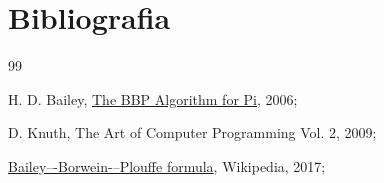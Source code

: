 \newpage
\section{Bibliografia}

\begingroup
\renewcommand{\section}[2]{}
\begin{thebibliography} {99}

    H. D. Bailey,
    \href{http://www.davidhbailey.com/dhbpapers/bbp-alg.pdf}{The BBP Algorithm for Pi},
    2006;
    
    D. Knuth,
    The Art of Computer Programming Vol. 2,
    2009;
  
    \href{https://en.wikipedia.org/wiki/Bailey%E2%80%93Borwein%E2%80%93Plouffe_formula}{Bailey–-Borwein-–Plouffe formula},
    Wikipedia,
    2017;
    
\end{thebibliography}
\endgroup